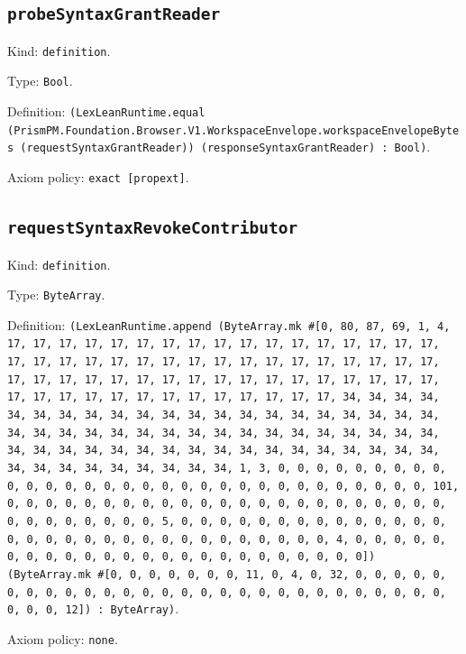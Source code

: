 \documentclass[11pt]{article}
\begin{document}
\subsection*{\texttt{probeSyntaxGrantReader}}
\noindent Kind: \texttt{definition}.\par
\noindent Type: \texttt{Bool}.\par
\noindent Definition: \texttt{(LexLeanRuntime.equal (PrismPM.Foundation.Browser.V1.WorkspaceEnvelope.workspaceEnvelopeBytes (requestSyntaxGrantReader)) (responseSyntaxGrantReader) : Bool)}.\par
\noindent Axiom policy: \texttt{exact [propext]}.\par
\subsection*{\texttt{requestSyntaxRevokeContributor}}
\noindent Kind: \texttt{definition}.\par
\noindent Type: \texttt{ByteArray}.\par
\noindent Definition: \texttt{(LexLeanRuntime.append (ByteArray.mk \#[0, 80, 87, 69, 1, 4, 17, 17, 17, 17, 17, 17, 17, 17, 17, 17, 17, 17, 17, 17, 17, 17, 17, 17, 17, 17, 17, 17, 17, 17, 17, 17, 17, 17, 17, 17, 17, 17, 17, 17, 17, 17, 17, 17, 17, 17, 17, 17, 17, 17, 17, 17, 17, 17, 17, 17, 17, 17, 17, 17, 17, 17, 17, 17, 17, 17, 17, 17, 17, 17, 34, 34, 34, 34, 34, 34, 34, 34, 34, 34, 34, 34, 34, 34, 34, 34, 34, 34, 34, 34, 34, 34, 34, 34, 34, 34, 34, 34, 34, 34, 34, 34, 34, 34, 34, 34, 34, 34, 34, 34, 34, 34, 34, 34, 34, 34, 34, 34, 34, 34, 34, 34, 34, 34, 34, 34, 34, 34, 34, 34, 34, 34, 34, 34, 1, 3, 0, 0, 0, 0, 0, 0, 0, 0, 0, 0, 0, 0, 0, 0, 0, 0, 0, 0, 0, 0, 0, 0, 0, 0, 0, 0, 0, 0, 0, 0, 0, 101, 0, 0, 0, 0, 0, 0, 0, 0, 0, 0, 0, 0, 0, 0, 0, 0, 0, 0, 0, 0, 0, 0, 0, 0, 0, 0, 0, 0, 0, 0, 0, 5, 0, 0, 0, 0, 0, 0, 0, 0, 0, 0, 0, 0, 0, 0, 0, 0, 0, 0, 0, 0, 0, 0, 0, 0, 0, 0, 0, 0, 0, 0, 0, 4, 0, 0, 0, 0, 0, 0, 0, 0, 0, 0, 0, 0, 0, 0, 0, 0, 0, 0, 0, 0, 0, 0, 0, 0]) (ByteArray.mk \#[0, 0, 0, 0, 0, 0, 0, 11, 0, 4, 0, 32, 0, 0, 0, 0, 0, 0, 0, 0, 0, 0, 0, 0, 0, 0, 0, 0, 0, 0, 0, 0, 0, 0, 0, 0, 0, 0, 0, 0, 0, 0, 0, 12]) : ByteArray)}.\par
\noindent Axiom policy: \texttt{none}.\par
\end{document}

